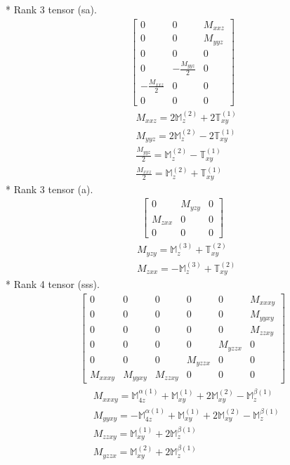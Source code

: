 \documentclass[fleqn,8pt,landscape]{jsarticle}
\begin{document}
* Rank 3 tensor (sa).
\begin{align*}
\begin{bmatrix} 0 & 0 & M_{xxz} \\ 0 & 0 & M_{yyz} \\ 0 & 0 & 0 \\ 0 & - \frac{M_{yyz}}{2} & 0 \\ - \frac{M_{xxz}}{2} & 0 & 0 \\ 0 & 0 & 0 \end{bmatrix}
\end{align*}
\begin{align*}
& M_{xxz} = 2 \mathbb{M}_{z}^{(2)} + 2 \mathbb{T}_{xy}^{(1)} \\
& M_{yyz} = 2 \mathbb{M}_{z}^{(2)} - 2 \mathbb{T}_{xy}^{(1)} \\
& \frac{M_{yyz}}{2} = \mathbb{M}_{z}^{(2)} - \mathbb{T}_{xy}^{(1)} \\
& \frac{M_{xxz}}{2} = \mathbb{M}_{z}^{(2)} + \mathbb{T}_{xy}^{(1)}
\end{align*}
* Rank 3 tensor (a).
\begin{align*}
\begin{bmatrix} 0 & M_{yzy} & 0 \\ M_{zxx} & 0 & 0 \\ 0 & 0 & 0 \end{bmatrix}
\end{align*}
\begin{align*}
& M_{yzy} = \mathbb{M}_{z}^{(3)} + \mathbb{T}_{xy}^{(2)} \\
& M_{zxx} = - \mathbb{M}_{z}^{(3)} + \mathbb{T}_{xy}^{(2)}
\end{align*}
* Rank 4 tensor (sss).
\begin{align*}
\begin{bmatrix} 0 & 0 & 0 & 0 & 0 & M_{xxxy} \\ 0 & 0 & 0 & 0 & 0 & M_{yyxy} \\ 0 & 0 & 0 & 0 & 0 & M_{zzxy} \\ 0 & 0 & 0 & 0 & M_{yzzx} & 0 \\ 0 & 0 & 0 & M_{yzzx} & 0 & 0 \\ M_{xxxy} & M_{yyxy} & M_{zzxy} & 0 & 0 & 0 \end{bmatrix}
\end{align*}
\begin{align*}
& M_{xxxy} = \mathbb{M}_{4z}^{\alpha(1)} + \mathbb{M}_{xy}^{(1)} + 2 \mathbb{M}_{xy}^{(2)} - \mathbb{M}_{z}^{\beta(1)} \\
& M_{yyxy} = - \mathbb{M}_{4z}^{\alpha(1)} + \mathbb{M}_{xy}^{(1)} + 2 \mathbb{M}_{xy}^{(2)} - \mathbb{M}_{z}^{\beta(1)} \\
& M_{zzxy} = \mathbb{M}_{xy}^{(1)} + 2 \mathbb{M}_{z}^{\beta(1)} \\
& M_{yzzx} = \mathbb{M}_{xy}^{(2)} + 2 \mathbb{M}_{z}^{\beta(1)}
\end{align*}
\end{document}
